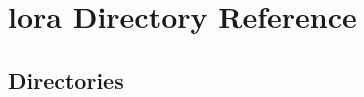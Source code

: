 \section{lora Directory Reference}
\label{dir_8d94fdbbcc9577416ffdbf6041ff9471}
\subsection*{Directories}
\begin{DoxyCompactItemize}
\end{DoxyCompactItemize}
